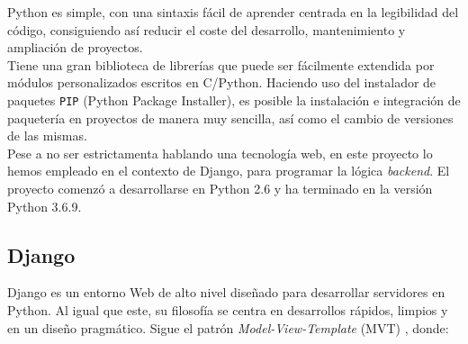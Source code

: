 \documentclass[11pt,a4paper]{book}
\begin{document}
				Python es simple, con una sintaxis fácil de aprender centrada en la legibilidad del código, consiguiendo así reducir el coste del desarrollo, mantenimiento y ampliación de proyectos.\\
				
				Tiene una gran biblioteca de librerías que puede ser fácilmente extendida por módulos personalizados escritos en C/Python. Haciendo uso del instalador de paquetes \texttt{PIP} (Python Package Installer), es posible la instalación e integración de paquetería en proyectos de manera muy sencilla, así como el cambio de versiones de las mismas.\\
				
				Pese a no ser estrictamenta hablando una tecnología web, en este proyecto lo hemos empleado en el contexto de Django, para programar la lógica \textit{backend}. El proyecto comenzó a desarrollarse en Python 2.6 y ha terminado en la versión Python 3.6.9.
				
				
			\subsection{Django}
				Django es un entorno Web de alto nivel diseñado para desarrollar servidores en Python. Al igual que este, su filosofía se centra en desarrollos rápidos, limpios y en un diseño pragmático. Sigue el patrón \textit{Model-View-Template} (MVT) \cite{Django MVC}, donde:\\
				
\end{document}
